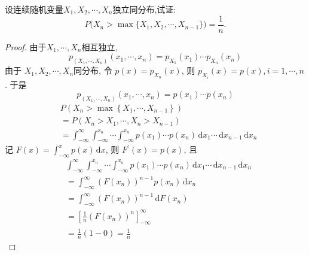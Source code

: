 \documentclass[../main.tex]{subfiles}
\begin{document}
\begin{exercise}{}{}
设连续随机变量\(X_1,X_2,\cdots,X_n\)独立同分布,试证:
\[
P\bigl(X_n>\max\{X_1,X_2,\cdots,X_{n-1}\}\bigr)=\frac1n.
\]
\end{exercise}

\begin{proof}
 由于\(  X_1,\cdots ,X_{n}  \)相互独立,  \[
 p_{\left( X_1,\cdots ,X_{n} \right) }\left( x_1,\cdots ,x_{n} \right)= p_{X_1}\left( x_1 \right)\cdots p_{X_{n}}\left( x_{n} \right)   
 \]由于 \(  X_1,X_2,\cdots ,X_{n}  \)同分布, 令 \(  p\left( x \right)= p_{X_{n}}\left( x \right)    \), 则  \(  p_{X_{i}}\left( x \right)= p\left( x \right), i=  1,\cdots,n     \). 于是 \[
 p_{\left( X_1,\cdots ,X_{n} \right) }\left( x_1,\cdots ,x_{n} \right)= p\left( x_1 \right)\cdots p\left( x_{n} \right)   
 \]    \[
 \begin{aligned}
 &P\left( X_{n}> \max \left\{ X_1,\cdots ,X_{n-1} \right\} \right)\\ 
  &= P\left( X_{n}> X_1,\cdots ,X_{n}> X_{n-1} \right)\\ 
   &= \int_{-\infty}^{\infty} \int_{-\infty}^{x_{n}}\cdots \int_{-\infty}^{x_{n}}p\left( x_1 \right)\cdots p\left( x_{n} \right)\,\mathrm{d} x_1\cdots \,\mathrm{d} x_{n-1}\,\mathrm{d} x_{n}     
 \end{aligned}
 \]记 \(  F\left( x \right)= \int_{-\infty}^{x}p\left( x \right)\,\mathrm{d} x    \), 则 \(  F^{\prime} \left( x \right)= p\left( x \right)    \), 且 \[
\begin{aligned}
 &\int_{-\infty}^{\infty}\int_{-\infty}^{x_{n}}\cdots \int_{-\infty}^{x_{n}}p\left( x_1 \right)\cdots p\left( x_{n} \right)\,\mathrm{d} x_1\cdots \,\mathrm{d} x_{n-1}\,\mathrm{d} x_{n}\\ 
  &= \int_{-\infty}^{\infty} \left( F\left( x_{n} \right)  \right)^{n-1}p\left( x_{n} \right) \,\mathrm{d} x_{n} \\ 
   &= \int_{-\infty}^{\infty}\left( F\left( x_{n} \right)  \right)^{n-1}\,\mathrm{d} F\left( x_{n} \right)  \\ 
    &= [\frac{1 }{n } \left( F\left( x_{n} \right) \right)^{n}  ]_{-\infty}^{\infty}\\ 
     &= \frac{1 }{n }\left( 1-0 \right)= \frac{1 }{n }   
\end{aligned}
 \]
\end{proof}
\end{document}
